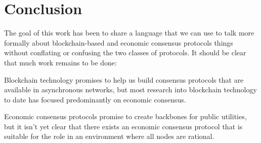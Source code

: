 \documentclass[11pt,a4paper]{article}
\theoremstyle{plain}
\theoremstyle{definition}
\begin{document}
\section{Conclusion}

The goal of this work has been to share a language that we can use to talk more formally about blockchain-based and economic consensus protocols things without conflating or confusing the two classes of protocols. It should be clear that much work remains to be done: 

Blockchain technology promises to help us build consensus protocols that are available in asynchronous networks, but most research into blockchain technology to date has focused predominantly on economic consensus.

Economic consensus protocols promise to create backbones for public utilities, but it isn't yet clear that there exists an economic consensus protocol that is suitable for the role in an environment where all nodes are rational.

\pagebreak


\end{document}
